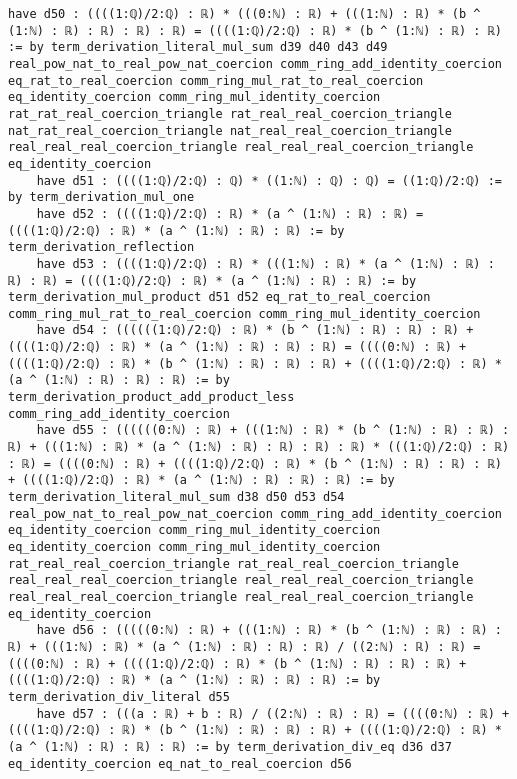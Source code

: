 \documentclass{article}
\begin{document}
\begin{tcolorbox}[colback=white!10, width=\linewidth]
\begin{lstlisting}[language=Lean4]
    have d50 : ((((1:ℚ)/2:ℚ) : ℝ) * (((0:ℕ) : ℝ) + (((1:ℕ) : ℝ) * (b ^ (1:ℕ) : ℝ) : ℝ) : ℝ) : ℝ) = ((((1:ℚ)/2:ℚ) : ℝ) * (b ^ (1:ℕ) : ℝ) : ℝ) := by term_derivation_literal_mul_sum d39 d40 d43 d49 real_pow_nat_to_real_pow_nat_coercion comm_ring_add_identity_coercion eq_rat_to_real_coercion comm_ring_mul_rat_to_real_coercion eq_identity_coercion comm_ring_mul_identity_coercion rat_rat_real_coercion_triangle rat_real_real_coercion_triangle nat_rat_real_coercion_triangle nat_real_real_coercion_triangle real_real_real_coercion_triangle real_real_real_coercion_triangle eq_identity_coercion
    have d51 : ((((1:ℚ)/2:ℚ) : ℚ) * ((1:ℕ) : ℚ) : ℚ) = ((1:ℚ)/2:ℚ) := by term_derivation_mul_one
    have d52 : ((((1:ℚ)/2:ℚ) : ℝ) * (a ^ (1:ℕ) : ℝ) : ℝ) = ((((1:ℚ)/2:ℚ) : ℝ) * (a ^ (1:ℕ) : ℝ) : ℝ) := by term_derivation_reflection
    have d53 : ((((1:ℚ)/2:ℚ) : ℝ) * (((1:ℕ) : ℝ) * (a ^ (1:ℕ) : ℝ) : ℝ) : ℝ) = ((((1:ℚ)/2:ℚ) : ℝ) * (a ^ (1:ℕ) : ℝ) : ℝ) := by term_derivation_mul_product d51 d52 eq_rat_to_real_coercion comm_ring_mul_rat_to_real_coercion comm_ring_mul_identity_coercion
    have d54 : ((((((1:ℚ)/2:ℚ) : ℝ) * (b ^ (1:ℕ) : ℝ) : ℝ) : ℝ) + ((((1:ℚ)/2:ℚ) : ℝ) * (a ^ (1:ℕ) : ℝ) : ℝ) : ℝ) = ((((0:ℕ) : ℝ) + ((((1:ℚ)/2:ℚ) : ℝ) * (b ^ (1:ℕ) : ℝ) : ℝ) : ℝ) + ((((1:ℚ)/2:ℚ) : ℝ) * (a ^ (1:ℕ) : ℝ) : ℝ) : ℝ) := by term_derivation_product_add_product_less comm_ring_add_identity_coercion
    have d55 : ((((((0:ℕ) : ℝ) + (((1:ℕ) : ℝ) * (b ^ (1:ℕ) : ℝ) : ℝ) : ℝ) + (((1:ℕ) : ℝ) * (a ^ (1:ℕ) : ℝ) : ℝ) : ℝ) : ℝ) * (((1:ℚ)/2:ℚ) : ℝ) : ℝ) = ((((0:ℕ) : ℝ) + ((((1:ℚ)/2:ℚ) : ℝ) * (b ^ (1:ℕ) : ℝ) : ℝ) : ℝ) + ((((1:ℚ)/2:ℚ) : ℝ) * (a ^ (1:ℕ) : ℝ) : ℝ) : ℝ) := by term_derivation_literal_mul_sum d38 d50 d53 d54 real_pow_nat_to_real_pow_nat_coercion comm_ring_add_identity_coercion eq_identity_coercion comm_ring_mul_identity_coercion eq_identity_coercion comm_ring_mul_identity_coercion rat_real_real_coercion_triangle rat_real_real_coercion_triangle real_real_real_coercion_triangle real_real_real_coercion_triangle real_real_real_coercion_triangle real_real_real_coercion_triangle eq_identity_coercion
    have d56 : (((((0:ℕ) : ℝ) + (((1:ℕ) : ℝ) * (b ^ (1:ℕ) : ℝ) : ℝ) : ℝ) + (((1:ℕ) : ℝ) * (a ^ (1:ℕ) : ℝ) : ℝ) : ℝ) / ((2:ℕ) : ℝ) : ℝ) = ((((0:ℕ) : ℝ) + ((((1:ℚ)/2:ℚ) : ℝ) * (b ^ (1:ℕ) : ℝ) : ℝ) : ℝ) + ((((1:ℚ)/2:ℚ) : ℝ) * (a ^ (1:ℕ) : ℝ) : ℝ) : ℝ) := by term_derivation_div_literal d55
    have d57 : (((a : ℝ) + b : ℝ) / ((2:ℕ) : ℝ) : ℝ) = ((((0:ℕ) : ℝ) + ((((1:ℚ)/2:ℚ) : ℝ) * (b ^ (1:ℕ) : ℝ) : ℝ) : ℝ) + ((((1:ℚ)/2:ℚ) : ℝ) * (a ^ (1:ℕ) : ℝ) : ℝ) : ℝ) := by term_derivation_div_eq d36 d37 eq_identity_coercion eq_nat_to_real_coercion d56

\end{lstlisting}
\end{tcolorbox}
\end{document}

